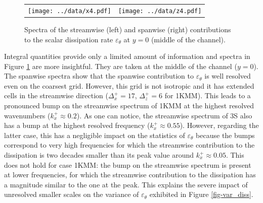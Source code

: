 \documentclass[review]{elsarticle}
\newcommand{\epst}{\varepsilon_\theta}
\begin{document}
\begin{figure}[htbp]
\begin{center}
\begin{tabular}{cc}
\texttt{[image: ../data/x4.pdf]} & 
\texttt{[image: ../data/z4.pdf]}
\end{tabular}
\end{center}
\caption{Spectra of the streamwise (left) and spanwise (right) contributions to the scalar dissipation rate $\epst$ at $y=0$ (middle of the channel).}
\label{fig-spec}
\end{figure}

Integral quantities provide only a limited amount of information and spectra in Figure \ref{fig-spec} are more insightful. They are taken at the middle of the channel ($y=0$). The spanwise spectra show that the spanwise contribution to $\epst$ is well resolved even on the coarsest grid. However, this grid is not isotropic and it has extended cells in the streamwise direction ($\Delta_x^+=17$, $\Delta_z^+=6$ for 1KMM). This leads to a pronounced bump on the streamwise spectrum of 1KMM at the highest resolved wavenumbers ($k_x^+\approx 0.2$). As one can notice, the streamwise spectrum of 3S also has a bump at the highest resolved frequency ($k_x^+\approx 0.55$). However, regarding the latter case, this has a negligible impact on the statistics of $\epst$ because the bumps correspond to very high frequencies for which the streamwise contribution to the dissipation is two decades smaller than its peak value around $k_x^+ \approx 0.05$. This does not hold for case 1KMM: the bump on the streamwise spectrum is present at lower frequencies, for which the streamwise contribution to the dissipation has a magnitude similar to the one at the peak. This explains the severe impact of {\color{red}unresolved} smaller scales on the variance of $\epst$ exhibited in  Figure \ref{fig-var_diss}.
\end{document}
